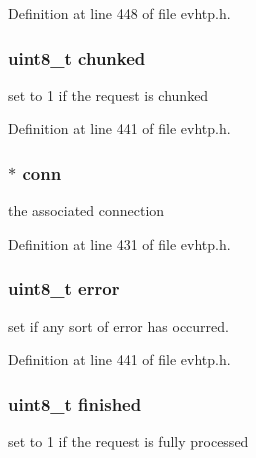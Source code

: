Definition at line 448 of file evhtp.\-h.

\hypertarget{structevhtp__request__s_a062fcf07a9fcab9030c339214afc281c}{
\subsubsection[{chunked}]{\setlength{\rightskip}{0pt plus 5cm}uint8\-\_\-t chunked}}\label{structevhtp__request__s_a062fcf07a9fcab9030c339214afc281c}
set to 1 if the request is chunked 

Definition at line 441 of file evhtp.\-h.

\hypertarget{structevhtp__request__s_a313e4d80c47517f02f2fe99e8840c280}{
\subsubsection[{conn}]{$\ast$ conn}}\label{structevhtp__request__s_a313e4d80c47517f02f2fe99e8840c280}
the associated connection 

Definition at line 431 of file evhtp.\-h.

\hypertarget{structevhtp__request__s_adc64ccb7538429fe78e3fe0139267370}{
\subsubsection[{error}]{\setlength{\rightskip}{0pt plus 5cm}uint8\-\_\-t error}}\label{structevhtp__request__s_adc64ccb7538429fe78e3fe0139267370}
set if any sort of error has occurred. 

Definition at line 441 of file evhtp.\-h.

\hypertarget{structevhtp__request__s_a7d906dc4f301a757a0a9b6087e9c8581}{
\subsubsection[{finished}]{\setlength{\rightskip}{0pt plus 5cm}uint8\-\_\-t finished}}\label{structevhtp__request__s_a7d906dc4f301a757a0a9b6087e9c8581}
set to 1 if the request is fully processed 

